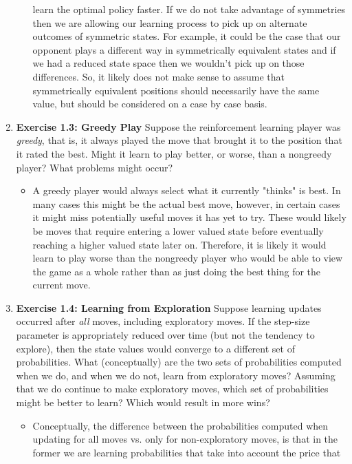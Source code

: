 \documentclass[12pt]{article}
\begin{document}
\begin{enumerate}[label=(\alph*)]
\begin{itemize}
    learn the optimal policy faster. If we do not take advantage of symmetries then we are allowing our learning process to 
    pick up on alternate outcomes of symmetric states. For example, it could be the case that our opponent plays a
    different way in symmetrically equivalent states and if we had a reduced state space then we wouldn't pick up
    on those differences. So, it likely does not make sense to assume that symmetrically equivalent positions should 
    necessarily have the same value, but should be considered on a case by case basis.
  \end{itemize}
  \item \textbf{Exercise 1.3: Greedy Play} Suppose the reinforcement learning player was \textit{greedy},
  that is, it always played the move that brought it to the position that it rated the best. Might it
  learn to play better, or worse, than a nongreedy player? What problems might occur?
  \begin{itemize}
    \item A greedy player would always select what it currently "thinks" is best. In many cases this might be
    the actual best move, however, in certain cases it might miss potentially useful moves it has yet to try.
    These would likely be moves that require entering a lower valued state before eventually reaching a higher
    valued state later on. Therefore, it is likely it would learn to play worse than the nongreedy player who
    would be able to view the game as a whole rather than as just doing the best thing for the current move.
  \end{itemize}
  \item \textbf{Exercise 1.4: Learning from Exploration} Suppose learning updates occurred after \textit{all}
  moves, including exploratory moves. If the step-size parameter is appropriately reduced over time (but not
  the tendency to explore), then the state values would converge to a different set of probabilities. What
  (conceptually) are the two sets of probabilities computed when we do, and when we do not, learn from exploratory
  moves? Assuming that we do continue to make exploratory moves, which set of probabilities might be better to learn?
  Which would result in more wins?
  \begin{itemize}
    \item Conceptually, the difference between the probabilities computed when updating for all moves vs. only for
    non-exploratory moves, is that in the former we are learning probabilities that take into account the price that

\end{itemize}
\end{enumerate}
\end{document}
